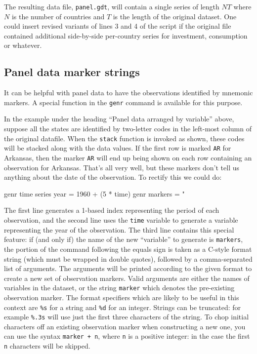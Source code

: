 
The resulting data file, \texttt{panel.gdt}, will contain a single
series of length $NT$ where $N$ is the number of countries and
$T$ is the length of the original dataset. One could insert revised
variants of lines 3 and 4 of the script if the original file contained
additional side-by-side per-country series for investment, consumption
or whatever.

\subsection{Panel data marker strings}

It can be helpful with panel data to have the observations identified
by mnemonic markers.  A special function in the \texttt{genr} command
is available for this purpose.

In the example under the heading ``Panel data arranged by variable''
above, suppose all the states are identified by two-letter codes in
the left-most column of the original datafile.  When the
\texttt{stack} function is invoked as shown, these codes will be
stacked along with the data values.  If the first row is marked
\texttt{AR} for Arkansas, then the marker \texttt{AR} will end up
being shown on each row containing an observation for Arkansas.
That's all very well, but these markers don't tell us anything about
the date of the observation.  To rectify this we could do:

\begin{code}
genr time
series year = 1960 + (5 * time)
genr markers = "%
\end{code}

The first line generates a 1-based index representing the period of
each observation, and the second line uses the \texttt{time} variable
to generate a variable representing the year of the observation.  The
third line contains this special feature: if (and only if) the name of
the new ``variable'' to generate is \texttt{markers}, the portion of
the command following the equals sign is taken as a C-style format
string (which must be wrapped in double quotes), followed by a
comma-separated list of arguments.  The arguments will be printed
according to the given format to create a new set of observation
markers.  Valid arguments are either the names of variables in the
dataset, or the string \texttt{marker} which denotes the pre-existing
observation marker.  The format specifiers which are likely to be
useful in this context are \texttt{\%s} for a string and \texttt{\%d}
for an integer.  Strings can be truncated: for example \texttt{\%.3s}
will use just the first three characters of the string.  To chop
initial characters off an existing observation marker when
constructing a new one, you can use the syntax \texttt{marker + n},
where \texttt{n} is a positive integer: in the case the first
\texttt{n} characters will be skipped.

